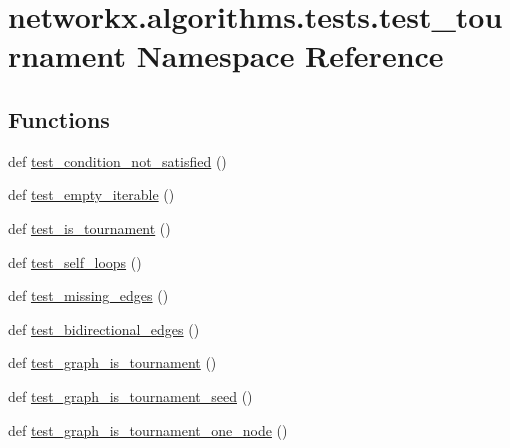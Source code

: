 \hypertarget{namespacenetworkx_1_1algorithms_1_1tests_1_1test__tournament}{}\section{networkx.\+algorithms.\+tests.\+test\+\_\+tournament Namespace Reference}
\label{namespacenetworkx_1_1algorithms_1_1tests_1_1test__tournament}
\subsection*{Functions}
\begin{DoxyCompactItemize}
\item 
def \hyperlink{namespacenetworkx_1_1algorithms_1_1tests_1_1test__tournament_acd76d8a07059fe65db6cd11132bfa716}{test\+\_\+condition\+\_\+not\+\_\+satisfied} ()
\item 
def \hyperlink{namespacenetworkx_1_1algorithms_1_1tests_1_1test__tournament_af59b30fb15f63505d86faea6587fc694}{test\+\_\+empty\+\_\+iterable} ()
\item 
def \hyperlink{namespacenetworkx_1_1algorithms_1_1tests_1_1test__tournament_a047e5aaa79fc1c977c6a6b2d1937902b}{test\+\_\+is\+\_\+tournament} ()
\item 
def \hyperlink{namespacenetworkx_1_1algorithms_1_1tests_1_1test__tournament_aca7d46f0bc7b2676e07104809ed5dc1a}{test\+\_\+self\+\_\+loops} ()
\item 
def \hyperlink{namespacenetworkx_1_1algorithms_1_1tests_1_1test__tournament_a936bfdea666b406bdd1b3f56cd3ca5b9}{test\+\_\+missing\+\_\+edges} ()
\item 
def \hyperlink{namespacenetworkx_1_1algorithms_1_1tests_1_1test__tournament_ad131658ec245dbdc82aae04f17862b17}{test\+\_\+bidirectional\+\_\+edges} ()
\item 
def \hyperlink{namespacenetworkx_1_1algorithms_1_1tests_1_1test__tournament_a1a9d44490331f12db4bb9fee4160aaf0}{test\+\_\+graph\+\_\+is\+\_\+tournament} ()
\item 
def \hyperlink{namespacenetworkx_1_1algorithms_1_1tests_1_1test__tournament_ab4108c71a5f4908effb3bb63bf9391f5}{test\+\_\+graph\+\_\+is\+\_\+tournament\+\_\+seed} ()
\item 
def \hyperlink{namespacenetworkx_1_1algorithms_1_1tests_1_1test__tournament_afbca78b287427b753f970422ce048732}{test\+\_\+graph\+\_\+is\+\_\+tournament\+\_\+one\+\_\+node} ()
\item 

\end{DoxyCompactItemize}
